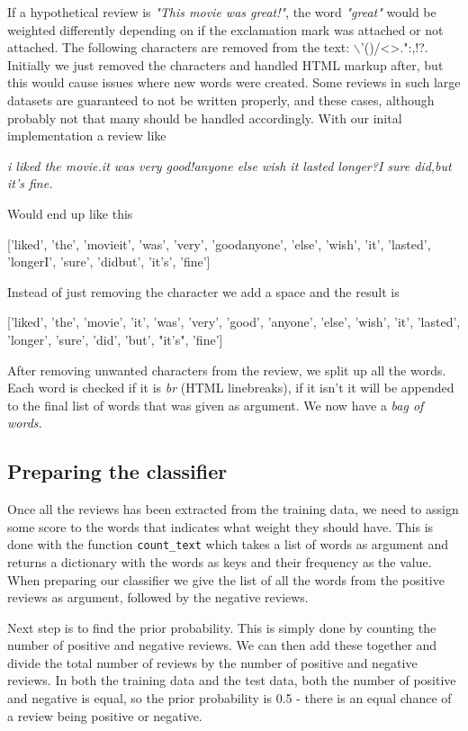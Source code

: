 \documentclass[a4paper,12pt]{article}
\begin{document}
If a hypothetical review is \textit{"This movie was great!"}, the word \textit{"great"} would be weighted differently depending on if the exclamation mark was attached or not attached. The following characters are removed from the text: $\backslash$'()/\textless \textgreater.":,!?. Initially we just removed the characters and handled HTML markup after, but this would cause issues where new words were created. Some reviews in such large datasets are guaranteed to not be written properly, and these cases, although probably not that many should be handled accordingly. With our inital implementation a review like
\begin{center}
    \textit{i liked the movie.it was very good!anyone else wish it lasted longer?I sure did,but it's fine.}
\end{center}
Would end up like this
\begin{center}
['liked', 'the', 'movieit', 'was', 'very', 'goodanyone', 'else', 'wish', 'it', 'lasted', 'longerI', 'sure', 'didbut', 'it's', 'fine']
\end{center}
Instead of just removing the character we add a space and the result is
\begin{center}
['liked', 'the', 'movie', 'it', 'was', 'very', 'good', 'anyone', 'else', 'wish', 'it', 'lasted', 'longer', 'sure', 'did', 'but', "it's", 'fine']
\end{center}
After removing unwanted characters from the review, we split up all the words. Each word is checked if it is \textit{br} (HTML linebreaks), if it isn't it will be appended to the final list of words that was given as argument. We now have a \textit{bag of words.}

\subsection{Preparing the classifier}
Once all the reviews has been extracted from the training data, we need to assign some score to the words that indicates what weight they should have. This is done with the function \texttt{count\_text} which takes a list of words as argument and returns a dictionary with the words as keys and their frequency as the value. When preparing our classifier we give the list of all the words from the positive reviews as argument, followed by the negative reviews. 

Next step is to find the prior probability. This is simply done by counting the number of positive and negative reviews. We can then add these together and divide the total number of reviews by the number of positive and negative reviews. In both the training data and the test data, both the number of positive and negative is equal, so the prior probability is 0.5 - there is an equal chance of a review being positive or negative. 
\end{document}
